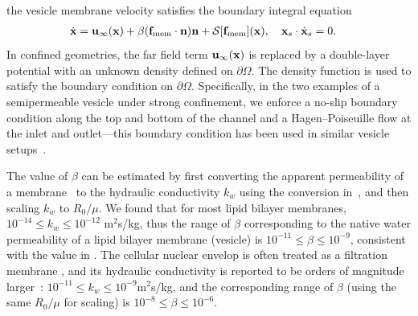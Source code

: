 \documentclass[prb,preprint,showpacs,preprintnumbers,amsmath,amssymb,longbibliography]{revtex4-1}
\begin{document}
%
the vesicle membrane velocity satisfies the boundary integral equation
\begin{align}
  \label{eqn:vesVelocity}
  \dot{\mathbf{x}} &= \mathbf{u}_\infty(\mathbf{x}) + \beta (\mathbf{f}_\mathrm{mem}\cdot\mathbf{n})\mathbf{n}
  + \mathcal{S} [\mathbf{f}_\mathrm{mem}](\mathbf{x}),  \quad
  \mathbf{x}_s \cdot \dot{\mathbf{x}}_s = 0.
\end{align}
In confined geometries, the far field term $\mathbf{u}_\infty(\mathbf{x})$ is replaced
by a double-layer potential with an unknown density defined on
$\partial\Omega$. The density function is used to satisfy the boundary
condition on $\partial\Omega$. Specifically, in the two examples of a semipermeable vesicle under strong confinement, we enforce a
no-slip boundary condition along the top and bottom of the channel and a
Hagen–Poiseuille flow at the inlet and outlet---this boundary condition
has been used in similar vesicle setups~\cite{qua-bir2014,
rah-vee-bir2010, lu-rah-zor2017}. 

The value of $\beta$ can be estimated by first
converting the apparent permeability of a 
membrane~\cite{OlbrichRawiczNeedhamEtAl2000_BJ} to the hydraulic
conductivity $k_w$ using the conversion
in~\citet{FettiplaceHaydon1980_PhysRev}, and then scaling $k_w$ to $R_0/\mu$. We found that for most lipid bilayer membranes, $10^{-14}\le
k_w\le 10^{-12}$ m$^2$s/kg, thus the range of $\beta$ corresponding to the native water permeability of a lipid bilayer membrane (vesicle) is $10^{-11}\le
\beta\le 10^{-9}$, consistent with the value in \citet{vogl2014effect}. 
The cellular nuclear envelop is often treated as a filtration membrane \cite{Shahin2019_AdvSci}, and 
its hydraulic conductivity is reported to be orders of magnitude larger~\cite{Wijmans1984_JMS}:
$10^{-11}\le k_w \le 10^{-9}$m$^2$s/kg,  and the corresponding range of $\beta$ (using the same $R_0/\mu$ for scaling) is $10^{-8}\le
\beta\le 10^{-6}$.
\end{document}
